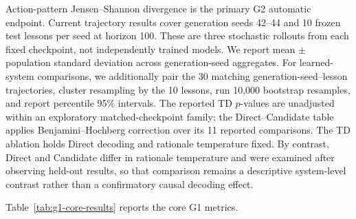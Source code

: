 \documentclass[manuscript,review,anonymous]{acmart}
\begin{document}
Action-pattern Jensen--Shannon divergence is the primary G2 automatic endpoint.
Current trajectory results cover generation seeds 42--44 and 10 frozen test
lessons per seed at horizon 100. These are three stochastic rollouts from each
fixed checkpoint, not independently trained models. We report mean $\pm$
population standard deviation across generation-seed aggregates. For
learned-system comparisons, we additionally pair the 30 matching
generation-seed--lesson trajectories, cluster resampling by the 10 lessons, run
10,000 bootstrap resamples, and report percentile 95\% intervals. The reported
TD $p$-values are unadjusted within an exploratory matched-checkpoint family;
the Direct--Candidate table applies Benjamini--Hochberg correction over its 11
reported comparisons. The TD ablation holds Direct decoding and rationale
temperature fixed. By contrast, Direct and Candidate differ in rationale
temperature and were examined after observing held-out results, so that
comparison remains a descriptive system-level contrast rather than a
confirmatory causal decoding effect.

Table~\ref{tab:g1-core-results} reports the core G1 metrics.

\begin{table}[t]
\centering
\small
\setlength{\tabcolsep}{4pt}
\caption{Core G1 results (mean $\pm$ population SD over three generation seeds
from each fixed checkpoint). Bold
values mark the best learned-system result in each column; diagnostic
baselines may be diverse without expert alignment.}
\label{tab:g1-core-results}
\end{table}
\end{document}
